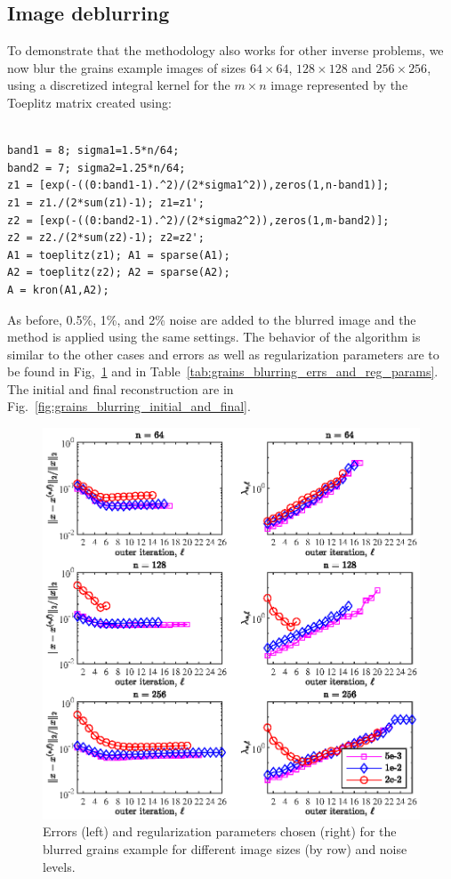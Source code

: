 \subsection{Image deblurring}
To demonstrate that the methodology also works for other inverse problems, we now blur the grains example images of sizes $64 \times 64$, $128 \times 128$ and $256 \times 256$, using a discretized integral kernel for the $m \times n$ image represented by the Toeplitz matrix created using:
\begin{verbatim}

band1 = 8; sigma1=1.5*n/64; 
band2 = 7; sigma2=1.25*n/64;
z1 = [exp(-((0:band1-1).^2)/(2*sigma1^2)),zeros(1,n-band1)];
z1 = z1./(2*sum(z1)-1); z1=z1';
z2 = [exp(-((0:band2-1).^2)/(2*sigma2^2)),zeros(1,m-band2)];
z2 = z2./(2*sum(z2)-1); z2=z2';
A1 = toeplitz(z1); A1 = sparse(A1); 
A2 = toeplitz(z2); A2 = sparse(A2);
A = kron(A1,A2);

\end{verbatim}
As before, 0.5\%, 1\%, and 2\% noise are added to the blurred image and the method is applied using the same settings. The behavior of the algorithm is similar to the other cases and errors as well as regularization parameters are to be found in Fig,~\ref{fig:grains_blurring_errs_and_reg_params} and in Table~\ref{tab:grains_blurring_errs_and_reg_params}. The initial and final reconstruction are in Fig.~\ref{fig:grains_blurring_initial_and_final}.
\begin{figure}[htbp]
\begin{center}
\includegraphics{figures/blurring_errs_and_reg_params}
\caption{Errors (left) and regularization parameters chosen (right) for the blurred grains example for different image sizes (by row) and noise levels.}
\label{fig:grains_blurring_errs_and_reg_params}
\end{center}
\end{figure}

